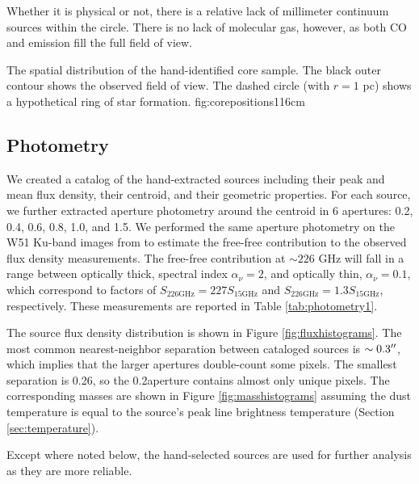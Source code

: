 \documentclass{emulateapj}
\begin{document}
Whether it is physical or not, there is a relative lack of millimeter continuum
sources within the circle.  There is no lack of molecular gas, however, as both
CO and \formaldehyde emission fill the full field of view.

{The spatial distribution of the hand-identified core sample.
The black outer contour shows the observed field of view.  The dashed circle
(with $r=1$ pc) shows a hypothetical ring of star formation.
}{fig:corepositions}{1}{16cm}


\subsection{Photometry}
\label{sec:photometry}
We created a catalog of the hand-extracted sources including their peak and mean
flux density, their centroid, and their geometric properties.  For each source,
we further extracted aperture photometry around the centroid in 6 apertures:
0.2, 0.4, 0.6, 0.8, 1.0, and 1.5\arcsec.  We performed the same aperture
photometry on the W51 Ku-band images from \citet{Ginsburg2016a} to estimate the
free-free contribution to the observed flux density measurements.  The
free-free contribution at $\sim226$ GHz will fall in a range between optically
thick, spectral index $\alpha_\nu=2$, and optically thin, $\alpha_\nu=0.1$,
which correspond to factors of $S_{226 \mathrm{GHz}} = 227 S_{15 \mathrm{GHz}}$
and $S_{226 \mathrm{GHz}} = 1.3 S_{15 \mathrm{GHz}}$, respectively.  These
measurements are reported in Table
\ref{tab:photometry1}.

The source flux density distribution is shown in Figure
\ref{fig:fluxhistograms}.  The most common nearest-neighbor separation between
cataloged sources is $\sim0.3\mbox{$^{\prime\prime}$}$, which implies that the larger apertures
double-count some pixels.  The smallest separation is 0.26\arcsec, so the
0.2\arcsec aperture contains almost only unique pixels.  The corresponding
masses are shown in Figure \ref{fig:masshistograms} assuming the dust
temperature is equal to the source's peak line brightness temperature (Section
\ref{sec:temperature}).


Except where noted below, the hand-selected sources are used for further
analysis as they are more reliable.



\end{document}
